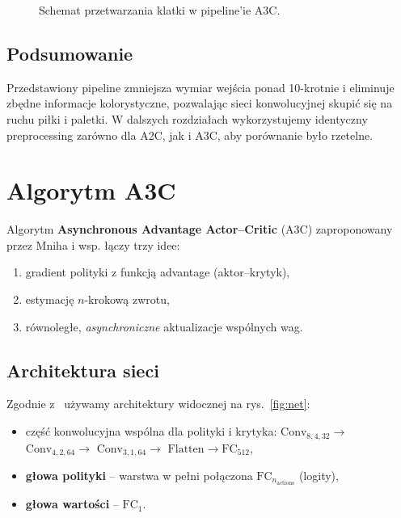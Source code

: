\documentclass[12pt,a4paper]{article}
\begin{document}
\begin{figure}[h]
  \centering
  \caption{Schemat przetwarzania klatki w pipeline’ie A3C.}
  \label{fig:pipeline}
\end{figure}

\subsection*{Podsumowanie}

Przedstawiony pipeline zmniejsza wymiar wejścia
ponad 10-krotnie i eliminuje zbędne informacje kolorystyczne,
pozwalając sieci konwolucyjnej skupić się na ruchu piłki i paletki.
W dalszych rozdziałach wykorzystujemy identyczny preprocessing
zarówno dla A2C, jak i A3C, aby porównanie było rzetelne.


\section{Algorytm A3C}
\label{sec:algorithms}

Algorytm \textbf{Asynchronous Advantage Actor–Critic} (A3C)
zaproponowany przez Mniha i wsp. \cite{Mnih2016A3C}
łączy trzy idee:
\begin{enumerate}
  \item gradient polityki z funkcją advantage (aktor–krytyk),
  \item estymację $n$-krokową zwrotu,
  \item równoległe, \emph{asynchroniczne} aktualizacje wspólnych wag.
\end{enumerate}

\subsection{Architektura sieci}
\label{sec:arch}

Zgodnie z~\cite{Mnih2016A3C,Lapan2018} używamy
architektury widocznej na rys.~\ref{fig:net}:
\begin{itemize}
  \item część konwolucyjna wspólna dla polityki i krytyka:  
        \(\mathrm{Conv}_{8,4,32}\rightarrow\)
        \(\mathrm{Conv}_{4,2,64}\rightarrow\)
        \(\mathrm{Conv}_{3,1,64}\rightarrow\)
        \(\mathrm{Flatten}\rightarrow\mathrm{FC}_{512}\),
  \item \textbf{głowa polityki} – warstwa w pełni połączona
        \(\mathrm{FC}_{n_\text{actions}}\) (logity),
  \item \textbf{głowa wartości} – \(\mathrm{FC}_{1}\).
\end{itemize}
\end{document}
